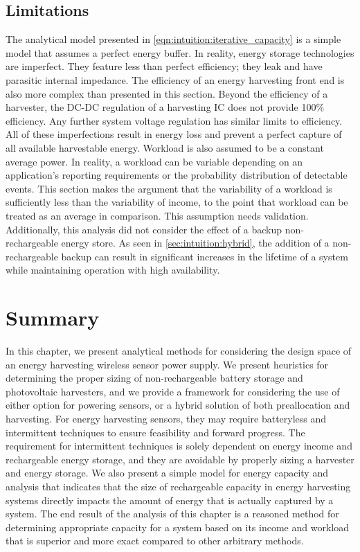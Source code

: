 \subsection{Limitations}
The analytical model presented in \cref{eqn:intuition:iterative_capacity} is a simple model that assumes a perfect energy buffer. In reality, energy storage technologies are imperfect. They feature less than perfect efficiency; they leak and have parasitic internal impedance. 
The efficiency of an energy harvesting front end is also more complex than presented in this section.
Beyond the efficiency of a harvester, the DC-DC regulation of a harvesting IC does not provide 100\% efficiency. 
Any further system voltage regulation has similar limits to efficiency. 
All of these imperfections result in energy loss and prevent a perfect capture of all available harvestable energy.
Workload is also assumed to be a constant average power. In reality, a workload can be variable depending on an application's reporting requirements or the probability distribution of detectable events.
This section makes the argument that the variability of a workload is sufficiently less than the variability of income, to the point that workload can be treated as an average in comparison. This assumption needs validation.
Additionally, this analysis did not consider the effect of a backup non-rechargeable energy store. As seen in \cref{sec:intuition:hybrid}, the addition of a non-rechargeable backup can result in significant increases in the lifetime of a system while maintaining operation with high availability.


\section{Summary}
In this chapter, we present analytical methods for considering the design space of an energy harvesting wireless sensor power supply.
We present heuristics for determining the proper sizing of non-rechargeable battery storage and photovoltaic harvesters, and we provide a framework for considering the use of either option for powering sensors, or a hybrid solution of both preallocation and harvesting.
For energy harvesting sensors, they may require batteryless and intermittent techniques to ensure feasibility and forward progress. 
The requirement for intermittent techniques is solely dependent on energy income and rechargeable energy storage, and they are avoidable by properly sizing a harvester and energy storage.
We also present a simple model for energy capacity and analysis that indicates that the size of rechargeable capacity in energy harvesting systems directly impacts the amount of energy that is actually captured by a system.
The end result of the analysis of this chapter is a reasoned method for determining appropriate capacity for a system based on its income and workload that is superior and more exact compared to other arbitrary methods. 

